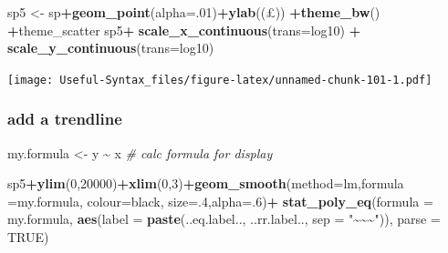\documentclass[
]{article}
\newenvironment{Shaded}{\begin{snugshade}}{\end{snugshade}}
\newcommand{\AttributeTok}[1]{\textcolor[rgb]{0.13,0.29,0.53}{#1}}
\newcommand{\CommentTok}[1]{\textcolor[rgb]{0.56,0.35,0.01}{\textit{#1}}}
\newcommand{\ConstantTok}[1]{\textcolor[rgb]{0.56,0.35,0.01}{#1}}
\newcommand{\DecValTok}[1]{\textcolor[rgb]{0.00,0.00,0.81}{#1}}
\newcommand{\FunctionTok}[1]{\textcolor[rgb]{0.13,0.29,0.53}{\textbf{#1}}}
\newcommand{\NormalTok}[1]{#1}
\newcommand{\OtherTok}[1]{\textcolor[rgb]{0.56,0.35,0.01}{#1}}
\newcommand{\SpecialCharTok}[1]{\textcolor[rgb]{0.81,0.36,0.00}{\textbf{#1}}}
\newcommand{\StringTok}[1]{\textcolor[rgb]{0.31,0.60,0.02}{#1}}
\begin{document}
\begin{Shaded}
\begin{Highlighting}[]
\NormalTok{sp5 }\OtherTok{\textless{}{-}}\NormalTok{ sp}\SpecialCharTok{+}\FunctionTok{geom\_point}\NormalTok{(}\AttributeTok{alpha=}\NormalTok{.}\DecValTok{01}\NormalTok{)}\SpecialCharTok{+}\FunctionTok{ylab}\NormalTok{(}\StringTok{\textquotesingle{}(£)\textquotesingle{}}\NormalTok{) }\SpecialCharTok{+}\FunctionTok{theme\_bw}\NormalTok{() }\SpecialCharTok{+}\NormalTok{theme\_scatter}
\NormalTok{sp5}\SpecialCharTok{+} \FunctionTok{scale\_x\_continuous}\NormalTok{(}\AttributeTok{trans=}\StringTok{\textquotesingle{}log10\textquotesingle{}}\NormalTok{) }\SpecialCharTok{+}
  \FunctionTok{scale\_y\_continuous}\NormalTok{(}\AttributeTok{trans=}\StringTok{\textquotesingle{}log10\textquotesingle{}}\NormalTok{)}
\end{Highlighting}
\end{Shaded}

\texttt{[image: Useful-Syntax\_files/figure-latex/unnamed-chunk-101-1.pdf]}

\hypertarget{add-a-trendline}{%
\subsubsection{add a trendline}\label{add-a-trendline}}

\begin{Shaded}
\begin{Highlighting}[]
\NormalTok{my.formula }\OtherTok{\textless{}{-}}\NormalTok{ y }\SpecialCharTok{\textasciitilde{}}\NormalTok{ x }\CommentTok{\# calc formula for display}

\NormalTok{sp5}\SpecialCharTok{+}\FunctionTok{ylim}\NormalTok{(}\DecValTok{0}\NormalTok{,}\DecValTok{20000}\NormalTok{)}\SpecialCharTok{+}\FunctionTok{xlim}\NormalTok{(}\DecValTok{0}\NormalTok{,}\DecValTok{3}\NormalTok{)}\SpecialCharTok{+}\FunctionTok{geom\_smooth}\NormalTok{(}\AttributeTok{method=}\StringTok{\textquotesingle{}lm\textquotesingle{}}\NormalTok{,}\AttributeTok{formula =}\NormalTok{my.formula,}
                                        \AttributeTok{colour=}\StringTok{\textquotesingle{}black\textquotesingle{}}\NormalTok{, }\AttributeTok{size=}\NormalTok{.}\DecValTok{4}\NormalTok{,}\AttributeTok{alpha=}\NormalTok{.}\DecValTok{6}\NormalTok{)}\SpecialCharTok{+}
  \FunctionTok{stat\_poly\_eq}\NormalTok{(}\AttributeTok{formula =}\NormalTok{ my.formula,}
               \FunctionTok{aes}\NormalTok{(}\AttributeTok{label =} \FunctionTok{paste}\NormalTok{(..eq.label.., ..rr.label..,}
                                                        \AttributeTok{sep =} \StringTok{"\textasciitilde{}\textasciitilde{}\textasciitilde{}"}\NormalTok{)), }\AttributeTok{parse =} \ConstantTok{TRUE}\NormalTok{)}
\end{Highlighting}
\end{Shaded}
\end{document}
